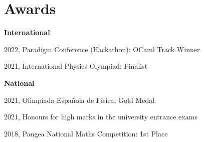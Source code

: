\section{Awards}
\large
\textbf{International}

\normalsize
2022, Paradigm Conference (Hackathon): OCaml Track Winner

2021, International Physics Olympiad: Finalist

\large
\vspace{5pt}
\setlength{\parindent}{0pt}\textbf{National}

\normalsize
\setlength{\parindent}{2em}
2021, Olimpíada Española de Física, Gold Medal

2021, Honours for high marks in the university entrance exams

2018, Pangea National Maths Competition: 1st Place